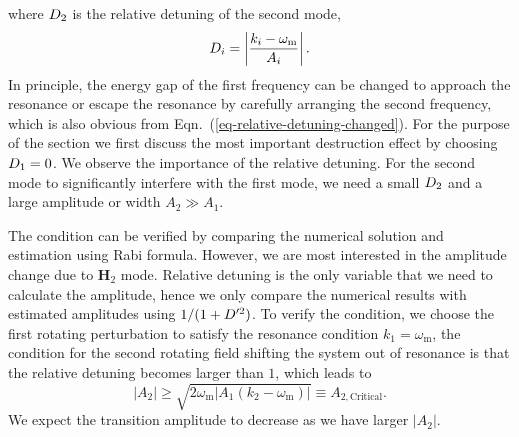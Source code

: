 where $D_2$ is the relative detuning of the second mode,
\begin{equation*}
D_i =  \left\lvert \frac{ k_i - \omega_{\mathrm m}}{A_i} \right \rvert.
\end{equation*}
In principle, the energy gap of the first frequency can be changed to approach the resonance or escape the resonance by carefully arranging the second frequency, which is also obvious from Eqn.~(\ref{eq-relative-detuning-changed}). For the purpose of the section we first discuss the most important destruction effect by choosing $D_1 = 0$. We observe the importance of the relative detuning. For the second mode to significantly interfere with the first mode, we need a small $D_2$ and a large amplitude or width $A_2\gg A_1$.

The condition can be verified by comparing the numerical solution and estimation using Rabi formula. However, we are most interested in the amplitude change due to $\mathbf H_2$ mode. Relative detuning is the only variable that we need to calculate the amplitude, hence we only compare the numerical results with estimated amplitudes using $1/(1+D'^2)$.
To verify the condition, we choose the first rotating perturbation to satisfy the resonance condition $k_1=\omega_{\mathrm{m}}$, the condition for the second rotating field shifting the system out of resonance is that the relative detuning becomes larger than $1$, which leads to
\begin{equation}
\lvert A_2 \rvert \geq \sqrt{2\omega_{\mathrm{m}} \lvert A_1 (k_2-\omega_{\mathrm m})\rvert} \equiv A_{2,\mathrm{Critical}}.
\end{equation}
We expect the transition amplitude to decrease as we have larger $\lvert A_2\rvert$.



